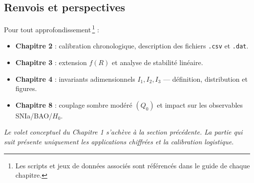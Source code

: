 \subsection{Renvois et perspectives}\label{sec:renvois}

Pour tout approfondissement\,\footnote{%
Les scripts et jeux de données associés sont référencés dans le
guide de chaque chapitre.} :
\begin{itemize}
  \item \textbf{Chapitre 2} : calibration chronologique, description des fichiers \texttt{.csv} et \texttt{.dat}.
  \item \textbf{Chapitre 3} : extension \(f(R)\) et analyse de stabilité linéaire.
  \item \textbf{Chapitre 4} : invariants adimensionnels \(I_{1},I_{2},I_{3}\) — définition, distribution et figures.
  \item \textbf{Chapitre 8} : couplage sombre modéré \((Q_{0})\) et impact sur les observables SNIa/BAO/\(H_{0}\).
\end{itemize}

\smallskip
\noindent\emph{Le volet conceptuel du Chapitre 1 s’achève à la section précédente. La partie qui suit présente uniquement les applications chiffrées et la calibration logistique.}
